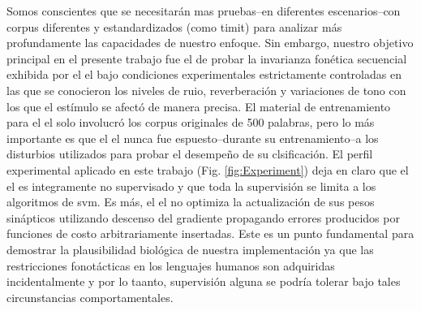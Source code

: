 Somos conscientes que se necesitarán mas pruebas--en diferentes escenarios--con corpus diferentes y estandardizados (como \gls{timit}) para analizar más profundamente las capacidades de nuestro enfoque.
Sin embargo, nuestro objetivo principal en el presente trabajo fue el de probar la invarianza fonética secuencial exhibida por el \gls{el} bajo condiciones experimentales estrictamente controladas en las que se conocieron los niveles de ruio, reverberación y variaciones de tono con los que el estímulo se afectó de manera precisa. El material de entrenamiento para el \gls{el} solo involucró los corpus originales de 500 palabras, pero lo más importante es que el \gls{el} nunca fue espuesto--durante su entrenamiento--a los disturbios utilizados para probar el desempeño de su clsificación. El perfil experimental aplicado en este trabajo (Fig. \ref{fig:Experiment}) deja en claro que el \gls{el} es integramente no supervisado y que toda la supervisión se limita a los algoritmos de \gls{svm}. Es más, el \gls{el} no optimiza la actualización de sus pesos sinápticos utilizando descenso del gradiente propagando errores producidos por funciones de costo arbitrariamente insertadas. Este es un punto fundamental para demostrar la plausibilidad biológica de nuestra implementación ya que las restricciones fonotácticas en los  lenguajes humanos son adquiridas incidentalmente \cite{BRENT199693,saffran_1997} y por lo taanto, supervisión alguna se podría tolerar bajo tales circunstancias comportamentales.

